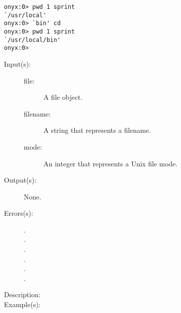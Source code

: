 \begin{description}
\begin{description}
\begin{verbatim}
onyx:0> pwd 1 sprint
`/usr/local'
onyx:0> `bin' cd
onyx:0> pwd 1 sprint
`/usr/local/bin'
onyx:0>
		\end{verbatim}
	\end{description}
\label{systemdict:chmod}
\item[{\onyxop{file/filename mode}{chmod}{--}}: ]
	\begin{description}\item[]
	\item[Input(s): ]
		\begin{description}\item[]
		\item[file: ]
			A file object.
		\item[filename: ]
			A string that represents a filename.
		\item[mode: ]
			An integer that represents a Unix file mode.
		\end{description}
	\item[Output(s): ] None.
	\item[Errors(s): ]
		\begin{description}\item[]
		\item[.]
		\item[.]
		\item[.]
		\item[.]
		\item[.]
		\item[.]
		\end{description}
	\item[Description: ]
	\item[Example(s): ]\begin{verbatim}


\end{verbatim}
\end{description}
\end{description}

